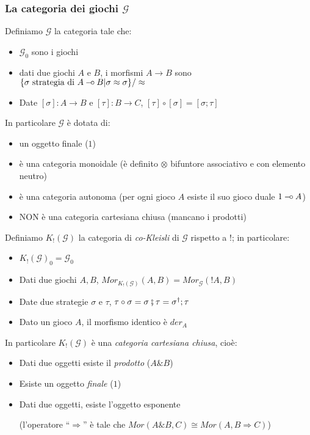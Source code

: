 \documentclass{beamer}
\newcommand{\limp}{\mathbin{{-}\mkern-3.5mu{\circ}}}
\begin{document}
\begin{frame}
 	
 	\frametitle{La categoria dei giochi $\mathcal{G}$}
 	
 	Definiamo $\mathcal{G}$ la categoria tale che:
 	\begin{itemize}
 		\item $\mathcal{G}_0$ sono i giochi
 		\item dati due giochi $A$ e $B$, i morfismi $A\rightarrow B$ sono $\{ \sigma \text{ strategia di } A\limp B | \sigma \approx \sigma \} / \approx$
 		\item Date $[\sigma] : A\rightarrow B$ e $[\tau] : B \rightarrow C$, $[\tau] \circ [\sigma] = [\sigma ; \tau]$
 	\end{itemize}
 	
 	In particolare $\mathcal{G}$ è dotata di:
 	\begin{itemize}
 		\item un oggetto finale ($1$)
 		\item è una categoria monoidale (è definito $\otimes$ bifuntore associativo e con elemento neutro)
 		\item è una categoria autonoma (per ogni gioco $A$ esiste il suo gioco duale $1 \limp A$)
 		\item NON è una categoria cartesiana chiusa (mancano i prodotti)
 	\end{itemize}
 	
 \end{frame}

\begin{frame}

Definiamo $K_!(\mathcal{G})$ la categoria di \emph{co-Kleisli} di $\mathcal{G}$ rispetto a $!$; in particolare:
	
	\begin{itemize}
		\item $K_!(\mathcal{G})_0 = \mathcal{G}_0$
		\item Dati due giochi $A,B$, $Mor_{K_!(\mathcal{G})}(A,B) = Mor_{\mathcal{G}}(!A,B)$
		\item Date due strategie $\sigma$ e $\tau$, $\tau \circ \sigma = \sigma \fatsemi \tau = \sigma ^\dag ; \tau$
		\item Dato un gioco $A$, il morfismo identico è $der_A$
	\end{itemize}

	In particolare $K_!(\mathcal{G})$ è una \emph{categoria cartesiana chiusa}, cioè:
	\begin{itemize}
		\item Dati due oggetti esiste il \emph{prodotto} ($A\& B$)
		\item Esiste un oggetto \emph{finale} ($1$)
		\item Dati due oggetti, esiste l'oggetto esponente 
		
		(l'operatore ``$\Rightarrow$'' è tale che $Mor(A\& B,C) \cong Mor(A,B\Rightarrow C)$)
	\end{itemize}

\end{frame}
\end{document}
